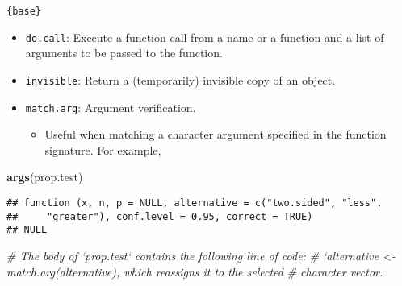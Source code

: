 \documentclass[
]{book}
\newenvironment{Shaded}{\begin{snugshade}}{\end{snugshade}}
\newcommand{\CommentTok}[1]{\textcolor[rgb]{0.56,0.35,0.01}{\textit{#1}}}
\newcommand{\KeywordTok}[1]{\textcolor[rgb]{0.13,0.29,0.53}{\textbf{#1}}}
\newcommand{\NormalTok}[1]{#1}
\providecommand{\tightlist}{%
  \setlength{\itemsep}{0pt}\setlength{\parskip}{0pt}}
\begin{document}
\texttt{\{base\}}

\begin{itemize}
\tightlist
\item
  \texttt{do.call}: Execute a function call from a name or a function and a list of arguments to be passed to the function.
\item
  \texttt{invisible}: Return a (temporarily) invisible copy of an object.
\item
  \texttt{match.arg}: Argument verification.

  \begin{itemize}
  \tightlist
  \item
    Useful when matching a character argument specified in the function signature. For example,
  \end{itemize}
\end{itemize}

\begin{Shaded}
\begin{Highlighting}[]
\KeywordTok{args}\NormalTok{(prop.test)}
\end{Highlighting}
\end{Shaded}

\begin{verbatim}
## function (x, n, p = NULL, alternative = c("two.sided", "less", 
##     "greater"), conf.level = 0.95, correct = TRUE) 
## NULL
\end{verbatim}

\begin{Shaded}
\begin{Highlighting}[]
\CommentTok{# The body of `prop.test` contains the following line of code:}
\CommentTok{# `alternative <- match.arg(alternative), which reassigns it to the selected}
\CommentTok{# character vector.}
\end{Highlighting}
\end{Shaded}
\end{document}
